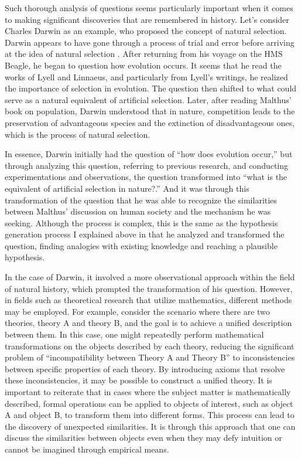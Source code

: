 Such thorough analysis of questions seems particularly important when it comes to making significant discoveries that are remembered in history. Let's consider Charles Darwin as an example, who proposed the concept of natural selection. Darwin appears to have gone through a process of trial and error before arriving at the idea of natural selection \cite{gribbin2022origin}. After returning from his voyage on the HMS Beagle, he began to question how evolution occurs. It seems that he read the works of Lyell and Linnaeus, and particularly from Lyell's writings, he realized the importance of selection in evolution. The question then shifted to what could serve as a natural equivalent of artificial selection. Later, after reading Malthus' book on population, Darwin understood that in nature, competition leads to the preservation of advantageous species and the extinction of disadvantageous ones, which is the process of natural selection.

In essence, Darwin initially had the question of ``how does evolution occur,'' but through analyzing this question, referring to previous research, and conducting experimentations and observations, the question transformed into ``what is the equivalent of artificial selection in nature?.'' And it was through this transformation of the question that he was able to recognize the similarities between Malthus' discussion on human society and the mechanism he was seeking. Although the process is complex, this is the same as the hypothesis generation process I explained above in that he analyzed and transformed the question, finding analogies with existing knowledge and reaching a plausible hypothesis.

In the case of Darwin, it involved a more observational approach within the field of natural history, which prompted the transformation of his question. However, in fields such as theoretical research that utilize mathematics, different methods may be employed. For example, consider the scenario where there are two theories, theory A and theory B, and the goal is to achieve a unified description between them. In this case, one might repeatedly perform mathematical transformations on the objects described by each theory, reducing the significant problem of ``incompatibility between Theory A and Theory B'' to inconsistencies between specific properties of each theory. By introducing axioms that resolve these inconsistencies, it may be possible to construct a unified theory. It is important to reiterate that in cases where the subject matter is mathematically described, formal operations can be applied to objects of interest, such as object A and object B, to transform them into different forms. This process can lead to the discovery of unexpected similarities. It is through this approach that one can discuss the similarities between objects even when they may defy intuition or cannot be imagined through empirical means. 

